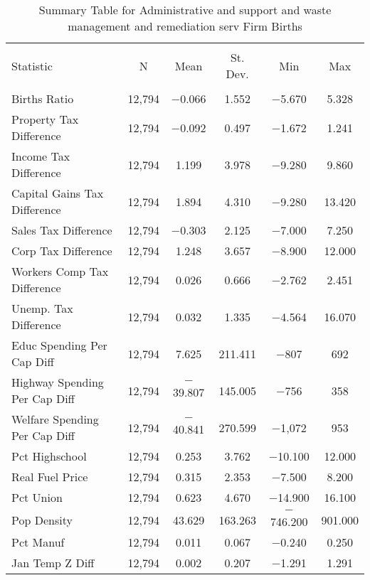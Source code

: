 
\begin{table}[!htbp] \centering 
  \caption{Summary Table for  Administrative and support and waste management and remediation serv Firm Births} 
  \label{56summary} 
\begin{tabular}{@{\extracolsep{5pt}}lccccc} 
\\[-1.8ex]\hline 
\hline \\[-1.8ex] 
Statistic & \multicolumn{1}{c}{N} & \multicolumn{1}{c}{Mean} & \multicolumn{1}{c}{St. Dev.} & \multicolumn{1}{c}{Min} & \multicolumn{1}{c}{Max} \\ 
\hline \\[-1.8ex] 
Births Ratio & 12,794 & $-$0.066 & 1.552 & $-$5.670 & 5.328 \\ 
Property Tax Difference & 12,794 & $-$0.092 & 0.497 & $-$1.672 & 1.241 \\ 
Income Tax Difference & 12,794 & 1.199 & 3.978 & $-$9.280 & 9.860 \\ 
Capital Gains Tax Difference & 12,794 & 1.894 & 4.310 & $-$9.280 & 13.420 \\ 
Sales Tax Difference & 12,794 & $-$0.303 & 2.125 & $-$7.000 & 7.250 \\ 
Corp Tax Difference & 12,794 & 1.248 & 3.657 & $-$8.900 & 12.000 \\ 
Workers Comp Tax Difference & 12,794 & 0.026 & 0.666 & $-$2.762 & 2.451 \\ 
Unemp. Tax Difference & 12,794 & 0.032 & 1.335 & $-$4.564 & 16.070 \\ 
Educ Spending Per Cap Diff & 12,794 & 7.625 & 211.411 & $-$807 & 692 \\ 
Highway Spending Per Cap Diff & 12,794 & $-$39.807 & 145.005 & $-$756 & 358 \\ 
Welfare Spending Per Cap Diff & 12,794 & $-$40.841 & 270.599 & $-$1,072 & 953 \\ 
Pct Highschool & 12,794 & 0.253 & 3.762 & $-$10.100 & 12.000 \\ 
Real Fuel Price & 12,794 & 0.315 & 2.353 & $-$7.500 & 8.200 \\ 
Pct Union & 12,794 & 0.623 & 4.670 & $-$14.900 & 16.100 \\ 
Pop Density & 12,794 & 43.629 & 163.263 & $-$746.200 & 901.000 \\ 
Pct Manuf & 12,794 & 0.011 & 0.067 & $-$0.240 & 0.250 \\ 
Jan Temp Z Diff & 12,794 & 0.002 & 0.207 & $-$1.291 & 1.291 \\ 

\end{tabular}
\end{table}
